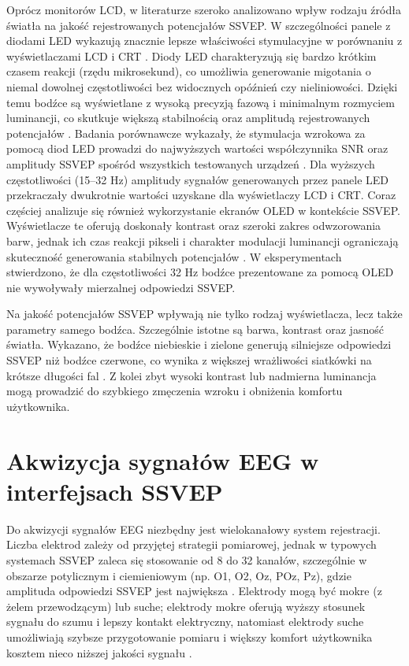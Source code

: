 Oprócz monitorów LCD, w literaturze szeroko analizowano wpływ rodzaju źródła światła na jakość rejestrowanych potencjałów SSVEP. W szczególności panele z diodami LED wykazują znacznie lepsze właściwości stymulacyjne w porównaniu z wyświetlaczami LCD i CRT \cite{wang2020}. Diody LED charakteryzują się bardzo krótkim czasem reakcji (rzędu mikrosekund), co umożliwia generowanie migotania o niemal dowolnej częstotliwości bez widocznych opóźnień czy nieliniowości. Dzięki temu bodźce są wyświetlane z wysoką precyzją fazową i minimalnym rozmyciem luminancji, co skutkuje większą stabilnością oraz amplitudą rejestrowanych potencjałów \cite{chen2015}. Badania porównawcze wykazały, że stymulacja wzrokowa za pomocą diod LED prowadzi do najwyższych wartości współczynnika SNR oraz amplitudy SSVEP spośród wszystkich testowanych urządzeń \cite{poryadina2022}. Dla wyższych częstotliwości (15--32 Hz) amplitudy sygnałów generowanych przez panele LED przekraczały dwukrotnie wartości uzyskane dla wyświetlaczy LCD i CRT. Coraz częściej analizuje się również wykorzystanie ekranów OLED w kontekście SSVEP. Wyświetlacze te oferują doskonały kontrast oraz szeroki zakres odwzorowania barw, jednak ich czas reakcji pikseli i charakter modulacji luminancji ograniczają skuteczność generowania stabilnych potencjałów \cite{poryadina2022}. W eksperymentach stwierdzono, że dla częstotliwości 32 Hz bodźce prezentowane za pomocą OLED nie wywoływały mierzalnej odpowiedzi SSVEP.

Na jakość potencjałów SSVEP wpływają nie tylko rodzaj wyświetlacza, lecz także parametry samego bodźca. Szczególnie istotne są barwa, kontrast oraz jasność światła. Wykazano, że bodźce niebieskie i zielone generują silniejsze odpowiedzi SSVEP niż bodźce czerwone, co wynika z większej wrażliwości siatkówki na krótsze długości fal \cite{wang2020, jia2010}. Z kolei zbyt wysoki kontrast lub nadmierna luminancja mogą prowadzić do szybkiego zmęczenia wzroku i obniżenia komfortu użytkownika.

\section{Akwizycja sygnałów EEG w interfejsach SSVEP}

Do akwizycji sygnałów EEG niezbędny jest wielokanałowy system rejestracji. Liczba elektrod zależy od przyjętej strategii pomiarowej, jednak w typowych systemach SSVEP zaleca się stosowanie od 8 do 32 kanałów, szczególnie w obszarze potylicznym i ciemieniowym (np. O1, O2, Oz, POz, Pz), gdzie amplituda odpowiedzi SSVEP jest największa \cite{nakanishi2018}. Elektrody mogą być mokre (z żelem przewodzącym) lub suche; elektrody mokre oferują wyższy stosunek sygnału do szumu i lepszy kontakt elektryczny, natomiast elektrody suche umożliwiają szybsze przygotowanie pomiaru i większy komfort użytkownika kosztem nieco niższej jakości sygnału \cite{mullen2015}.

